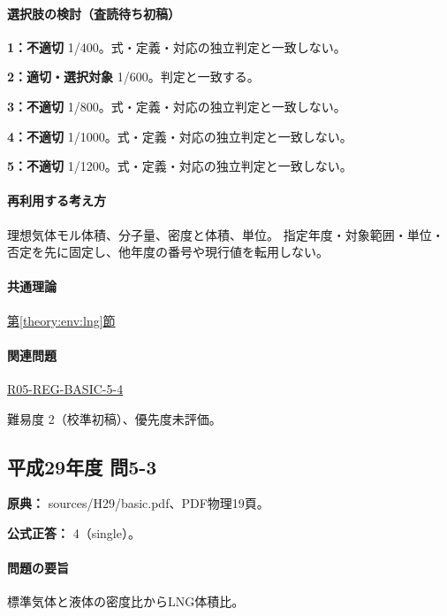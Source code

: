 \paragraph{選択肢の検討（査読待ち初稿）}\mbox{}\par

\noindent\textbf{1：不適切} 1/400。式・定義・対応の独立判定と一致しない。\par

\noindent\textbf{2：適切・選択対象} 1/600。判定と一致する。\par

\noindent\textbf{3：不適切} 1/800。式・定義・対応の独立判定と一致しない。\par

\noindent\textbf{4：不適切} 1/1000。式・定義・対応の独立判定と一致しない。\par

\noindent\textbf{5：不適切} 1/1200。式・定義・対応の独立判定と一致しない。\par

\paragraph{再利用する考え方} 理想気体モル体積、分子量、密度と体積、単位。 指定年度・対象範囲・単位・否定を先に固定し、他年度の番号や現行値を転用しない。

\paragraph{共通理論} \hyperref[theory:env:lng]{第\ref*{theory:env:lng}節}

\paragraph{関連問題} \hyperref[q:r05-reg-basic-5-4]{R05-REG-BASIC-5-4}

\par 難易度 2（校準初稿）、優先度未評価。

\subsection{平成29年度 問5-3}
\label{q:h29-reg-basic-5-3}

\noindent\textbf{原典：} sources/H29/basic.pdf、PDF物理19頁。

\textbf{公式正答：} 4（single）。

\paragraph{問題の要旨} 標準気体と液体の密度比からLNG体積比。

